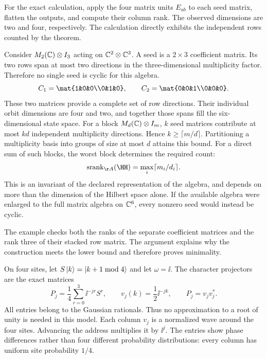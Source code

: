 For the exact calculation, apply the four matrix units $E_{ab}$ to each seed matrix, flatten the outputs, and compute their column rank. The observed dimensions are two and four, respectively. The calculation directly exhibits the independent rows counted by the theorem.

Consider $M_2(\CC)\otimes I_3$ acting on $\CC^2\otimes\CC^3$. A seed is a $2\times3$ coefficient matrix. Its two rows span at most two directions in the three-dimensional multiplicity factor. Therefore no single seed is cyclic for this algebra.
\[
C_1=\mat{1&0&0\\0&1&0},\qquad
C_2=\mat{0&0&1\\0&0&0}.
\]
These two matrices provide a complete set of row directions. Their individual orbit dimensions are four and two, and together those spans fill the six-dimensional state space.
For a block $M_d(\CC)\otimes I_m$, $k$ seed matrices contribute at most $kd$ independent multiplicity directions. Hence $k\ge\lceil m/d\rceil$. Partitioning a multiplicity basis into groups of size at most $d$ attains this bound. For a direct sum of such blocks, the worst block determines the required count:
\[
\operatorname{srank}_{\AA}(\HH)=\max_i\lceil m_i/d_i\rceil.
\]
This is an invariant of the declared representation of the algebra, and depends on more than the dimension of the Hilbert space alone. If the available algebra were enlarged to the full matrix algebra on $\CC^6$, every nonzero seed would instead be cyclic.

The example checks both the ranks of the separate coefficient matrices and the rank three of their stacked row matrix. The argument explains why the construction meets the lower bound and therefore proves minimality.

On four sites, let $S\left|k\right\rangle=\left|k+1\bmod4\right\rangle$ and let $\omega=\ii$. The character projectors are the exact matrices
\[
P_j=\frac14\sum_{r=0}^3\ii^{-jr}S^r,
\qquad v_j(k)=\frac12\ii^{-jk},\qquad P_j=v_jv_j^*.
\]
All entries belong to the Gaussian rationals. Thus no approximation to a root of unity is needed in this model.
Each column $v_j$ is a normalized wave around the four sites. Advancing the address multiplies it by $\ii^j$. The entries show phase differences rather than four different probability distributions: every column has uniform site probability $1/4$.

